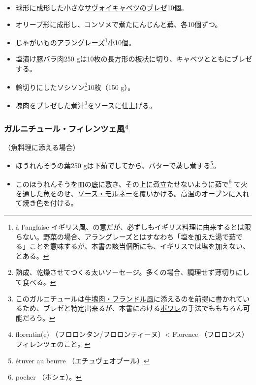 \begin{recette}
\begin{itemize}
\item
  球形に成形した小さな\protect\hyperlink{chou-braise}{サヴォイキャベツのブレゼ}10個。
\item
  オリーブ形に成形し、コンソメで煮たにんじんと蕪、各10個ずつ。
\item
  \protect\hyperlink{pommes-de-terres-a-l-anglaise}{じゃがいものアラングレーズ}\footnote{à
    l'anglaise
    イギリス風、の意だが、必ずしもイギリス料理に由来するとは限らない。野菜の場合、アラングレーズとはすなわち「塩を加えた湯で茹でる」ことを意味するが、本書の該当個所にも、イギリスでは塩を加えない、とある。}小10個。
\item
  塩漬け豚バラ肉250
  gは10枚の長方形の板状に切り、キャベツとともにブレゼする。
\item
  輪切りにしたソシソン\footnote{熟成、乾燥させてつくる太いソーセージ。多くの場合、調理せず薄切りにして食べる。}10枚（150
  g）。
\item
  塊肉をブレゼした煮汁\footnote{このガルニチュールは\protect\hyperlink{piece-de-boeuf-a-la-flammande}{牛塊肉・フランドル風}に添えるのを前提に書かれているため、ブレゼと特定出来るが、本書における\protect\hyperlink{les-poeles}{ポワレ}の手法でももちろん可能だろう。}をソースに仕上げる。
\end{itemize}

\hypertarget{garniture-a-la-florentine}{%
\subsubsection[ガルニチュール・フィレンツェ風]{\texorpdfstring{ガルニチュール・フィレンツェ風\footnote{florentin(e)
  （フロロンタン/フロロンティーヌ）\textless{} Florence
  （フロロンス）フィレンツェのこと。}}{ガルニチュール・フィレンツェ風}}\label{garniture-a-la-florentine}}



（魚料理に添える場合）

\begin{itemize}
\item
  ほうれんそうの葉250 gは下茹でしてから、バターで蒸し煮する\footnote{étuver
    au beurre （エチュヴェオブール）}。
\item
  このほうれんそうを皿の底に敷き、その上に煮立たせないように茹で\footnote{pocher
    （ポシェ）。}
  て火を通した魚をのせ、\protect\hyperlink{sauce-mornay}{ソース・モルネー}を覆いかける。高温のオーブンに入れて焼き色を付ける。
\end{itemize}


\end{recette}
